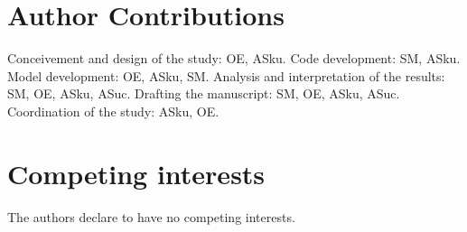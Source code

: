 \documentclass[oneside, 10pt, a4paper, twocolumn]{article}
\begin{document}
\section*{Author Contributions}

Conceivement and design of the study: OE, ASku. 
Code development: SM, ASku. 
Model development: OE, ASku, SM. 
Analysis and interpretation of the results: SM, OE, ASku, ASuc. 
Drafting the manuscript: SM, OE, ASku, ASuc. 
Coordination of the study: ASku, OE. 
 

\section*{Competing interests}

The authors declare to have no competing interests.







%
%



\clearpage


\end{document}
